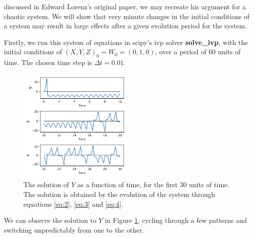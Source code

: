 \documentclass[10pt, letterpaper]{article}
\begin{document}
discussed in Edward Lorenz's original paper, we may recreate his argument for a chaotic system. We will show that very minute changes in the initial conditions of a system may result in large effects after a given evolution period for the system.

Firstly, we run this system of equations in scipy's ivp solver \textbf{solve\_ivp}, with the initial conditions of $\left( X, Y, Z \right)_0 = W_0 = (0, 1, 0)$, over a period of $60$ units of time. The chosen time step is $\Delta t = 0.01$.

\begin{figure}[H]
    \hspace*{-5mm}
        \centering
        \includegraphics[width =0.5\textwidth]{y_time.pdf}
        \caption{The solution of $Y$ as a function of time, for the first $30$ units of time. The solution is obtained by the evolution of the system through equations \ref{eq:2}, \ref{eq:3} and \ref{eq:4}.}
        \label{fig:y1}
\end{figure}

We can observe the solution to $Y$ in Figure \ref{fig:y1}, cycling through a few patterns and switching unpredictably from one to the other.
\end{document}
